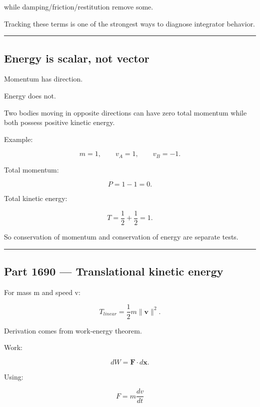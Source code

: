 while damping/friction/restitution remove some.

Tracking these terms is one of the strongest ways to diagnose integrator behavior.

\begin{center}\rule{0.5\linewidth}{0.5pt}\end{center}

\subsection{Energy is scalar, not vector}\label{06-engine-ii-ch039-energy-is-scalar-not-vector}

\hypertarget{06-engine-ii-ch039-energy-is-scalar-not-vector}{}

Momentum has direction.

Energy does not.

Two bodies moving in opposite directions can have zero total momentum while both possess positive kinetic energy.

Example:

\[
m=1,
\qquad
v_A=1,
\qquad
v_B=-1.
\]

Total momentum:

\[
P=1-1=0.
\]

Total kinetic energy:

\[
T=
\frac12+
\frac12
=
1.
\]

So conservation of momentum and conservation of energy are separate tests.

\begin{center}\rule{0.5\linewidth}{0.5pt}\end{center}

\subsection{Part 1690 --- Translational kinetic energy}\label{06-engine-ii-ch039-part-1690-translational-kinetic-energy}

\hypertarget{06-engine-ii-ch039-part-1690-translational-kinetic-energy}{}

For mass m and speed v:

\[
\boxed{
T_{linear}
=
\frac12m\|\mathbf v\|^2.
}
\]

Derivation comes from work-energy theorem.

Work:

\[
dW
=
\mathbf F\cdot d\mathbf x.
\]

Using:

\[
F=m\frac{dv}{dt}
\]

